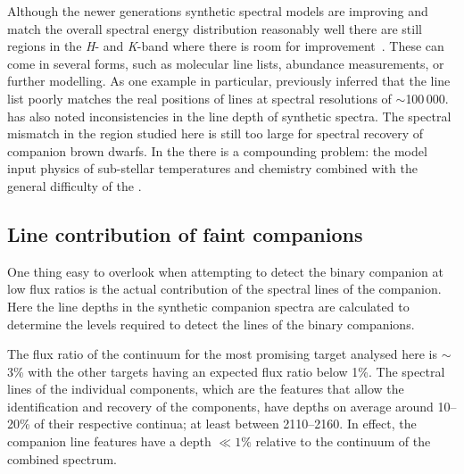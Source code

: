 
Although the newer generations synthetic spectral models are improving and match the overall spectral energy distribution reasonably well there are still regions in the \emph{H}- and \emph{K}-band where there is room for improvement~\citep{rajpurohit_spectral_2016}.
These can come in several forms, such as molecular line lists, abundance measurements, or further modelling.
As one example in particular, \citet{rajpurohit_spectral_2016} previously inferred that the  line list poorly matches the real positions of  lines at spectral resolutions of \(\sim\)100\,000.
\citet{passegger_carmenes_2018} has also noted inconsistencies in the line depth of synthetic spectra.
The spectral mismatch in the region studied here is still too large for spectral recovery of companion brown dwarfs.
In the \nir{} there is a compounding problem: the model input physics of sub-stellar temperatures and chemistry combined with the general difficulty of the \nir{}.

\subsection{Line contribution of faint companions}
\label{subsec:line_contributions}
One thing easy to overlook when attempting to detect the binary companion at low flux ratios is the actual contribution of the spectral lines of the companion.
Here the line depths in the synthetic companion spectra are calculated to determine the \snr{} levels required to detect the lines of the binary companions.

The flux ratio of the continuum for the most promising target analysed here is \FtwoFone{}\(\sim\)3\% with the other targets having an expected flux ratio below 1\%.
The spectral lines of the individual components, which are the features that allow the identification and recovery of the components, have depths on average around 10--20\% of their respective continua; at least between 2110--2160\nm{}.
In effect, the companion line features have a depth \(\ll 1\%\) relative to the continuum of the combined spectrum.

